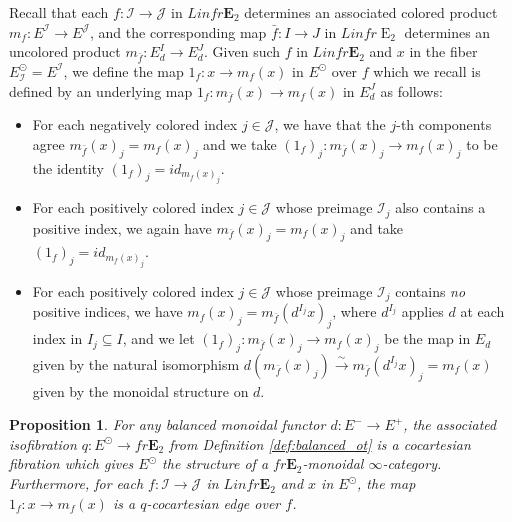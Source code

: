 \documentclass[reqno]{amsart}
\newtheorem{proposition}[lemma]{Proposition}
\theoremstyle{definition}
\newcommand{\mcl}[1]{\mathcal{#1}}
\newcommand{\opn}[1]{\operatorname{#1}}
\newcommand{\E}{\mathbf{E}}
\renewcommand{\1}{\mathbf{1}}
\begin{document}
Recall that each $f:\mcl{I}\to\mcl{J}$ in $Linfr\E_2$ determines an associated colored product $m_f:E^{\mcl{I}}\to E^{\mcl{J}}$, and the corresponding map $\bar{f}:I\to J$ in $Linfr\opn{E}_2$ determines an uncolored product $m_{\bar{f}}:E_d^I\to E_d^J$. Given such $f$ in $Linfr\E_2$ and $x$ in the fiber $E^{\odot}_{\mcl{I}}=E^{\mcl{I}}$, we define the map $1_f:x\to m_f(x)$ in $E^{\odot}$ over $f$ which we recall is defined by an underlying map $1_f:m_{\bar{f}}(x)\to m_f(x)$ in $E_d^J$ as follows:
\begin{itemize}
\item For each negatively colored index $j\in\mcl{J}$, we have that the $j$-th components agree $m_{\bar{f}}(x)_j=m_f(x)_j$ and we take $(1_f)_j:m_{\bar{f}}(x)_j\to m_f(x)_j$ to be the identity $(1_f)_j=id_{m_f(x)_j}$.\vspace{1mm}
\item For each positively colored index $j\in\mcl{J}$ whose preimage $\mcl{I}_j$ also contains a positive index, we again have $m_{\bar{f}}(x)_j=m_{f}(x)_j$ and take $(1_f)_j=id_{m_f(x)_j}$.\vspace{1mm}
\item For each positively colored index $j\in\mcl{J}$ whose preimage $\mcl{I}_j$ contains \emph{no} positive indices, we have $m_{f}(x)_j=m_{\bar{f}}(d^{I_j}x)_j$, where $d^{I_j}$ applies $d$ at each index in $I_j\subseteq I$, and we let $(1_f)_j:m_{\bar{f}}(x)_j\to m_f(x)_j$ be the map in $E_d$ given by the natural isomorphism $d(m_{\bar{f}}(x)_j)\overset{\sim}\to m_{\bar{f}}(d^{I_j}x)_j=m_f(x)$ given by the monoidal structure on $d$.
\end{itemize}

\begin{proposition}\label{prop:balanced1}
For any balanced monoidal functor $d:E^-\to E^+$, the associated isofibration $q:E^{\odot}\to fr\E_2$ from Definition \ref{def:balanced_ot} is a cocartesian fibration which gives $E^{\odot}$ the structure of a $fr\E_2$-monoidal $\infty$-category.  Furthermore, for each $f:\mcl{I}\to\mcl{J}$ in $Linfr\E_2$ and $x$ in $E^{\odot}$, the map $1_f:x\to m_f(x)$ is a $q$-cocartesian edge over $f$.
\end{proposition}
\end{document}
